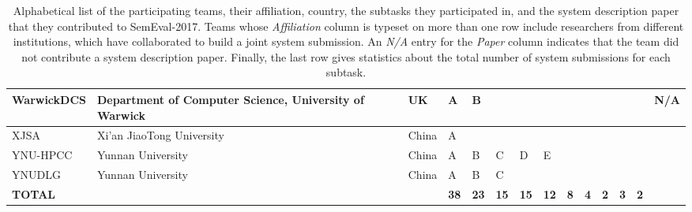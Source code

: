 \begin{table}[h!]
\begin{scriptsize}
\begin{tabular}{|l|p{4.5cm}|p{1.8cm} | lllll | lllll |p{3.8cm}|}
\hline
WarwickDCS	&	Department of Computer Science, University of Warwick	&	UK	&	A	&	B	&		&		&		&		&		&		&		&		&	N/A	\\
\hline
XJSA	&	Xi'an JiaoTong University 	&	China	&	A	&		&		&		&		&		&		&		&		&		&	\cite{SemEval:2017:task4:xjsa} \\
\hline
YNU-HPCC	&	Yunnan University	&	China	&	A	&	B	&	C	&	D	&	E	&		&		&		&		&		&	\cite{SemEval:2017:task4:ynu-hpcc} \\
\hline
YNUDLG	&	Yunnan University	&	China	&	A	&	B	&	C	&		&		&		&		&		&		&		&	\cite{SemEval:2017:task4:ynu-1510} \\
\hline
\multicolumn{3}{l}{\bf TOTAL}				&	\bf 38	&	\bf 23	&	\bf 15	&	\bf 15	&	\multicolumn{1}{c}{\bf 12}	&	\bf 8	&	\bf 4	&	\bf 2	&	\bf 3	&	\multicolumn{1}{c}{\bf 2}	&	\multicolumn{1}{c}{ } \\
\end{tabular}
\caption{Alphabetical list of the participating teams, their affiliation, country, the subtasks they participated in, and the system description paper that they contributed to SemEval-2017. Teams whose \emph{Affiliation} column is typeset on more than one row include researchers from different institutions, which have collaborated to build a joint system submission.  An \emph{N/A} entry for the \emph{Paper} column indicates that the team did not contribute a system description paper. Finally, the last row gives statistics about the total number of system submissions for each subtask.} 
\label{table:Affiliations}
\end{scriptsize}
\end{table}